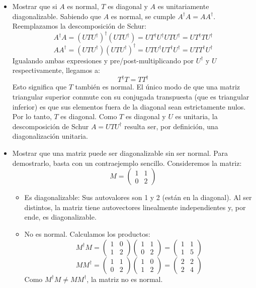 \documentclass[11pt,spanish]{article}
\begin{document}
\begin{itemize}
\begin{itemize}
\item Mostrar que si $A$ es normal, $T$ es diagonal y $A$ es unitariamente diagonalizable.
Sabiendo que $A$ es normal, se cumple $A^\dagger A = A A^\dagger$. Reemplazamos la descomposición de Schur:
$$A^\dagger A = (U T U^\dagger)^\dagger (U T U^\dagger) = U T^\dagger U^\dagger U T U^\dagger = U T^\dagger T U^\dagger$$
$$A A^\dagger = (U T U^\dagger) (U T U^\dagger)^\dagger = U T U^\dagger U T^\dagger U^\dagger = U T T^\dagger U^\dagger$$
Igualando ambas expresiones y pre/post-multiplicando por $U^\dagger$ y $U$ respectivamente, llegamos a:
$$T^\dagger T = T T^\dagger$$
Esto significa que $T$ también es normal. El único modo de que una matriz triangular superior conmute con su conjugada transpuesta (que es triangular inferior) es que sus elementos fuera de la diagonal sean estrictamente nulos. Por lo tanto, $T$ es diagonal.
Como $T$ es diagonal y $U$ es unitaria, la descomposición de Schur $A = U T U^\dagger$ resulta ser, por definición, una diagonalización unitaria.

\item Mostrar que una matriz puede ser diagonalizable sin ser normal.
Para demostrarlo, basta con un contraejemplo sencillo. Consideremos la matriz:
$$M = \begin{pmatrix} 1 & 1 \\ 0 & 2 \end{pmatrix}$$
\begin{itemize}
\item Es diagonalizable: Sus autovalores son 1 y 2 (están en la diagonal). Al ser distintos, la matriz tiene autovectores linealmente independientes y, por ende, es diagonalizable.
\item No es normal. Calculamos los productos:
    $$M^\dagger M = \begin{pmatrix} 1 & 0 \\ 1 & 2 \end{pmatrix} \begin{pmatrix} 1 & 1 \\ 0 & 2 \end{pmatrix} = \begin{pmatrix} 1 & 1 \\ 1 & 5 \end{pmatrix}$$
    $$M M^\dagger = \begin{pmatrix} 1 & 1 \\ 0 & 2 \end{pmatrix} \begin{pmatrix} 1 & 0 \\ 1 & 2 \end{pmatrix} = \begin{pmatrix} 2 & 2 \\ 2 & 4 \end{pmatrix}$$
    Como $M^\dagger M \neq M M^\dagger$, la matriz no es normal.
\end{itemize}
\end{itemize}
\end{itemize}
\end{document}
